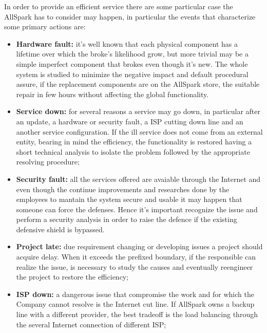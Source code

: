 In order to provide an efficient service there are some particular case the AllSpark has to consider may happen, in particular the events that characterize some primary actions are:
\begin{itemize}
  \item {\bf Hardware fault:} it's well known that each physical component has a lifetime over which the broke's likelihood grow, but more trivial may be a simple imperfect component that brokes even though it's new. The whole system is studied to minimize the negative impact and default procedural assure, if the replacement components are on the AllSpark store, the suitable repair in few hours without affecting the global functionality.
  \item {\bf Service down:} for several reasons a service may go down, in particular after an update, a hardware or security fault, a ISP cutting down line and an another service configuration. If the ill service does not come from an external entity, bearing in mind the efficiency, the functionality is restored having a short technical analysis to isolate the problem followed by the appropriate resolving procedure;
  \item {\bf Security fault:} all the services offered are avaiable through the Internet and even though the continue improvements and researches done by the employees to mantain the system secure and usable it may happen that someone can force the defenses. Hence it's important recognize the issue and perform a security analysis in order to raise the defence if the existing defensive shield is bypassed.
  \item {\bf Project late:} due requirement changing or developing issues a project should acquire delay. When it exceeds the prefixed boundary, if the responsible can realize the issue, is necessary to study the causes and eventually reengineer the project to restore the efficiency;
  \item {\bf ISP down:} a dangerous issue that compromise the work and for which the Company cannot resolve is the Internet cut line. If AllSpark owns a backup line with a different provider, the best tradeoff is the load balancing through the several Internet connection of different ISP;
\end{itemize}

